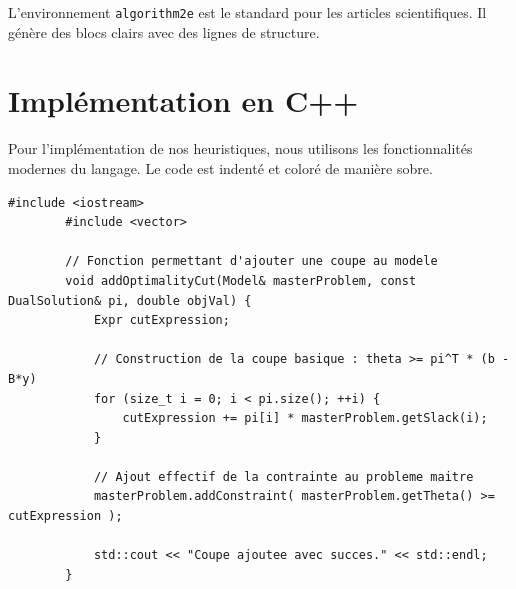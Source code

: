 \documentclass[12pt, a4paper, twoside]{report}
\numberwithin{equation}{section}
\begin{document}
	L'environnement \texttt{algorithm2e} est le standard pour les articles scientifiques. Il génère des blocs clairs avec des lignes de structure.
	
	\section{Implémentation en C++}
	
	Pour l'implémentation de nos heuristiques, nous utilisons les fonctionnalités modernes du langage. Le code est indenté et coloré de manière sobre.
	
	\begin{lstlisting}[caption={Ajout d'une coupe d'optimalité au solveur}, label={lst:cut_benders}]
		#include <iostream>
		#include <vector>
		
		// Fonction permettant d'ajouter une coupe au modele
		void addOptimalityCut(Model& masterProblem, const DualSolution& pi, double objVal) {
			Expr cutExpression;
			
			// Construction de la coupe basique : theta >= pi^T * (b - B*y)
			for (size_t i = 0; i < pi.size(); ++i) {
				cutExpression += pi[i] * masterProblem.getSlack(i);
			}
			
			// Ajout effectif de la contrainte au probleme maitre
			masterProblem.addConstraint( masterProblem.getTheta() >= cutExpression );
			
			std::cout << "Coupe ajoutee avec succes." << std::endl;
		}
	\end{lstlisting}
	
	\clearpage
	\thispagestyle{empty}
	\null
	\addtocounter{page}{-1}
	
	
\end{document}
